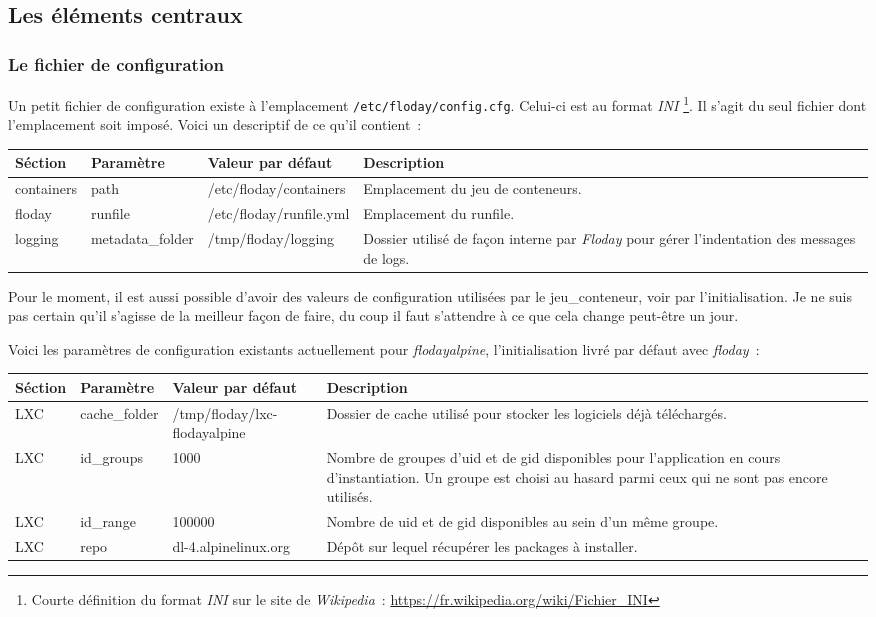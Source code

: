 \subsection{Les éléments centraux}

\subsubsection{Le fichier de configuration}
Un petit fichier de configuration existe à l'emplacement {\tt/etc/floday/config.cfg}.
Celui-ci est au format \emph{INI}%
\footnote{Courte définition du format \emph{INI} sur le site de \emph{Wikipedia}~:
	\url{https://fr.wikipedia.org/wiki/Fichier_INI}
}.
Il s'agit du seul fichier dont l'emplacement soit imposé.
Voici un descriptif de ce qu'il contient~:
\newline

\begin{tabular}{|l|l|p{4cm}|p{4.1cm}|}
	\hline
	Séction & Paramètre & Valeur par défaut & Description \\
	\hline
	containers & path & /etc/floday/containers & Emplacement du jeu de conteneurs.\\
	floday & runfile & /etc/floday/runfile.yml & Emplacement du \gls{runfile}. \\
	logging & metadata\_folder & /tmp/floday/logging & Dossier utilisé de façon interne par \emph{Floday} pour gérer l'indentation des messages de logs. \\
	\hline
\end{tabular}
\newline

Pour le moment, il est aussi possible d'avoir des valeurs de configuration utilisées par le \gls{jeu_conteneur}, voir par l'\gls{initialisation}.
Je ne suis pas certain qu'il s'agisse de la meilleur façon de faire, du coup il faut s'attendre à ce que cela change peut-être un jour.

Voici les paramètres de configuration existants actuellement pour  \emph{flodayalpine}, l'initialisation livré par défaut avec \emph{floday}~:
\newline

\begin{tabular}{|l|l|p{4cm}|p{5.25cm}|}
	\hline
	Séction & Paramètre & Valeur par défaut & Description \\
	\hline
	LXC & cache\_folder & /tmp/floday/lxc-flodayalpine & Dossier de cache utilisé pour stocker les logiciels déjà téléchargés.\\
	LXC & id\_groups & 1000 & Nombre de groupes d'uid et de gid disponibles pour l'\gls{application} en cours d'\gls{instantiation}. Un groupe est choisi au hasard parmi ceux qui ne sont pas encore utilisés.\\
	LXC & id\_range & 100000 & Nombre de uid et de gid disponibles au sein d'un même groupe.\\
	LXC & repo & dl-4.alpinelinux.org & Dépôt sur lequel récupérer les packages à installer.\\
	\hline
\end{tabular}
\newline

